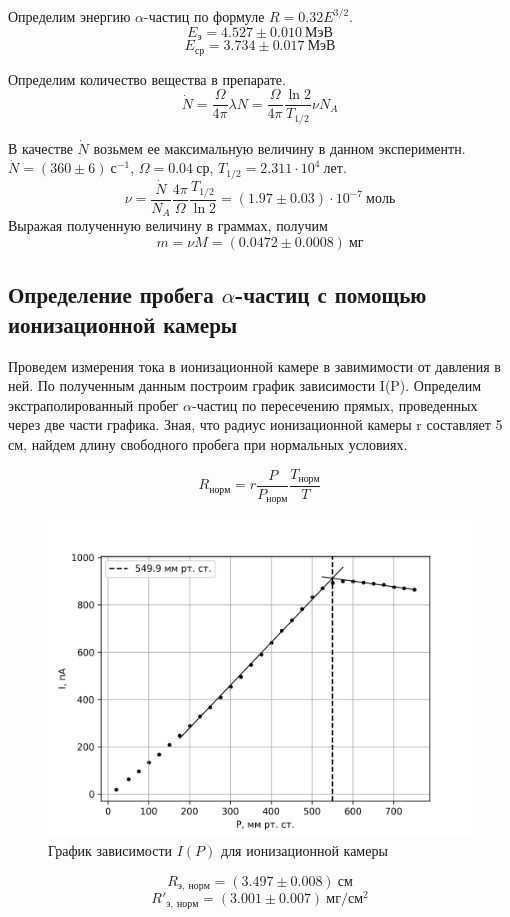 \documentclass[14pt, a4paper]{report}
\begin{document}
Определим энергию $\alpha$-частиц по формуле $R=0.32E^{3/2}$.
\[E_{э}=4.527\pm0.010\ МэВ\]
\[E_{ср}=3.734\pm0.017\ МэВ\]

Определим количество вещества в препарате.
\[\dot{N}=\frac{\Omega}{4\pi}\lambda N=\frac{\Omega}{4\pi}\frac{\ln{2}}{T_{1/2}}\nu N_A\]

В качестве $\dot{N}$ возьмем ее максимальную величину в данном экспериментн. $\dot{N}=(360\pm6)\ с^{-1}$, $\Omega=0.04\ ср$, $T_{1/2}=2.311\cdot10^4\ лет$.
\[\nu=\frac{\dot{N}}{N_A}\frac{4\pi}{\Omega}\frac{T_{1/2}}{\ln{2}}=(1.97\pm0.03)\cdot10^{-7}\ моль\]
Выражая полученную величину в граммах, получим
\[m=\nu M=(0.0472\pm0.0008)\ мг\]

\subsection{Определение пробега $\alpha$-частиц с помощью ионизационной камеры}

Проведем измерения тока в ионизационной камере в завимимости от давления в ней. По полученным данным построим график зависимости I(P). Определим экстраполированный пробег $\alpha$-частиц по пересечению прямых, проведенных через две части графика. Зная, что радиус ионизационной камеры r составляет 5 см, найдем длину свободного пробега при нормальных условиях.

\[R_{норм}=r\frac{P}{P_{норм}}\frac{T_{норм}}{T}\]

\begin{figure}[H]
\centering
\includegraphics[width=.7\linewidth]{../images/541-7}
\caption{График зависимости $I(P)$ для ионизационной камеры}
\end{figure}

\[R_{э,\ норм}=(3.497\pm0.008)\ см\]
\[R'_{э,\ норм}=(3.001\pm0.007)\ мг/см^2\]
\end{document}

